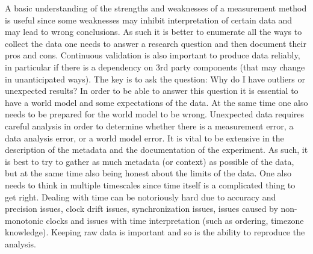A basic understanding of the strengths and weaknesses of a measurement method
is useful since some weaknesses may inhibit interpretation of certain data and
may lead to wrong conclusions. As such it is better to enumerate all the ways
to collect the data one needs to answer a research question and then document
their pros and cons. Continuous validation \cite{pgill:comcom:2011} is also
important to produce data reliably, in particular if there is a dependency on
3rd party components (that may change in unanticipated ways).  The key is to
ask the question: Why do I have outliers or unexpected results?  In order to
be able to answer this question it is essential to have a world model
\cite{rbush:jsac:2011} and some expectations of the data.  At the same time
one also needs to be prepared for the world model to be wrong.  Unexpected
data requires careful analysis in order to determine whether there is a
measurement error, a data analysis error, or a world model error.  It is vital
to be extensive in the description of the metadata \cite{vpaxson:imc:2004} and
the documentation of the experiment. As such, it is best to try to gather as
much metadata (or context) as possible of the data, but at the same time also
being honest about the limits of the data.  One also needs to think in
multiple timescales since time itself is a complicated thing to get right.
Dealing with time can be notoriously hard due to accuracy and precision
issues, clock drift issues, synchronization issues, issues caused by
non-monotonic clocks and issues with time interpretation (such as ordering,
timezone knowledge). Keeping raw data is important and so is the ability to
reproduce the analysis.

